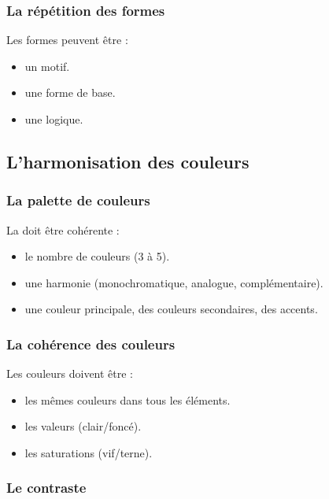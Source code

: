 \subsubsection{La répétition des formes}

Les formes peuvent être  :

\begin{itemize}
    \item {} un motif.
    \item {} une forme de base.
    \item {} une logique.
\end{itemize}

\subsection{L'harmonisation des couleurs}

\subsubsection{La palette de couleurs}

La  doit être cohérente :

\begin{itemize}
    \item {} le nombre de couleurs (3 à 5).
    \item {} une harmonie (monochromatique, analogue, complémentaire).
    \item {} une couleur principale, des couleurs secondaires, des accents.
\end{itemize}

\subsubsection{La cohérence des couleurs}

Les couleurs doivent être  :

\begin{itemize}
    \item {} les mêmes couleurs dans tous les éléments.
    \item {} les valeurs (clair/foncé).
    \item {} les saturations (vif/terne).
\end{itemize}

\subsubsection{Le contraste}

